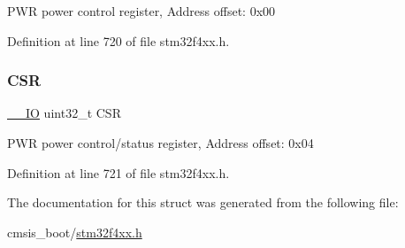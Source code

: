 P\+WR power control register, Address offset\+: 0x00 

Definition at line 720 of file stm32f4xx.\+h.

\mbox{\label{struct_p_w_r___type_def_a876dd0a8546697065f406b7543e27af2}} 
\subsubsection{\texorpdfstring{C\+SR}{CSR}}
{\footnotesize\ttfamily \hyperlink{group___c_m_s_i_s__core__definitions_gaec43007d9998a0a0e01faede4133d6be}{\+\_\+\+\_\+\+IO} uint32\+\_\+t C\+SR}

P\+WR power control/status register, Address offset\+: 0x04 

Definition at line 721 of file stm32f4xx.\+h.



The documentation for this struct was generated from the following file\+:\begin{DoxyCompactItemize}
\item 
cmsis\+\_\+boot/\hyperlink{stm32f4xx_8h}{stm32f4xx.\+h}\end{DoxyCompactItemize}
